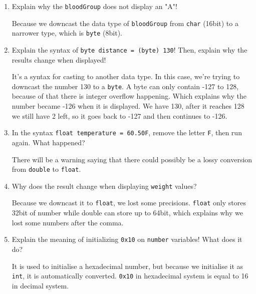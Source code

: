 \documentclass[12pt,titlepage]{article}
\begin{document}
\begin{enumerate}
    \item { 
        Explain why the \texttt{bloodGroup} does not display an "A"!

        Because we downcast the data type of \texttt{bloodGroup} from \texttt{char} (16bit) to a narrower type, which is \texttt{byte} (8bit).
    }
    \item {
        Explain the syntax of \texttt{byte distance = (byte) 130}! Then, explain why the results change when displayed!

        It's a syntax for casting to another data type. In this case, we're trying to downcast the number 130 to a \texttt{byte}.
        A byte can only contain -127 to 128, because of that there is integer overflow happening. Which explains why the number became -126 when it is displayed.
        We have 130, after it reaches 128 we still have 2 left, so it goes back to -127 and then continues to -126.
    }
    \item {
        In the syntax \texttt{float temperature = 60.50F}, remove the letter \texttt{F}, then run again. What happened?

        There will be a warning saying that there could possibly be a lossy conversion from \texttt{double} to \texttt{float}.
    }
    \item {
        Why does the result change when displaying \texttt{weight} values?

        Because we downcast it to \texttt{float}, we lost some precisions. \texttt{float} only stores 32bit of number while double can store up to 64bit, which explains why we lost some numbers after the comma.
    }
    \item {
        Explain the meaning of initializing \texttt{0x10} on \texttt{number} variables! What does it do?

        It is used to initialise a hexadecimal number, but because we initialise it as \texttt{int}, it is automatically converted.
        \texttt{0x10} in hexadecimal system is equal to 16 in decimal system.
    }
\end{enumerate}
\end{document}
